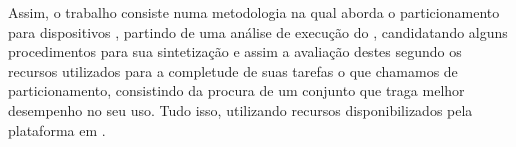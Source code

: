       Assim, o trabalho consiste numa metodologia na qual aborda o particionamento para dispositivos \wearables, partindo de uma análise de execução do \software, candidatando alguns procedimentos para sua sintetização e assim a avaliação destes segundo os recursos utilizados para a completude de suas tarefas o que chamamos de particionamento, consistindo da procura de um conjunto que traga melhor desempenho no seu uso.
      Tudo isso, utilizando recursos disponibilizados pela plataforma em \hardware.
